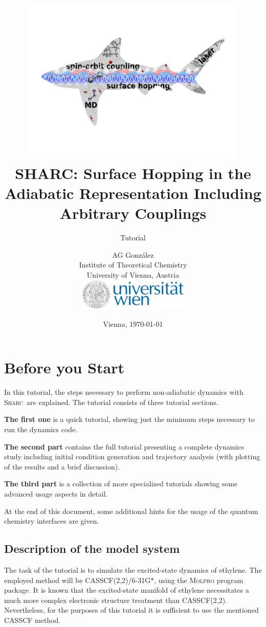 \documentclass[a4paper,11pt,DIV=15,openany]{scrbook}
\title{\hspace{1cm}\includegraphics[width=0.8\textwidth,keepaspectratio=true]{img/sharc.pdf}\vspace{1.5cm}\\
    SHARC: Surface Hopping in the Adiabatic Representation Including Arbitrary Couplings}
\subtitle{Tutorial}
\date{Vienna, \today}
\author{AG Gonz\'alez\\
Institute of Theoretical Chemistry\\
University of Vienna, Austria
\vspace{1cm}
\\
\includegraphics[width=0.4\textwidth,keepaspectratio=true]{img/univie.pdf}}
\newcommand{\sharc}{\textsc{Sharc}}
\begin{document}


\tableofcontents


\chapter{Before you Start}

In this tutorial, the steps necessary to perform non-adiabatic dynamics with \sharc\ are explained. 
The tutorial consists of three tutorial sections. 

\textbf{The first one} is a quick tutorial, showing just the minimum steps necessary to run the dynamics code. 

\textbf{The second part} contains the full tutorial presenting a complete dynamics study including initial condition generation and trajectory analysis (with plotting of the results and a brief discussion). 

\textbf{The third part} is a collection of more specialized tutorials showing some advanced usage aspects in detail.

At the end of this document, some additional hints for the usage of the quantum chemistry interfaces are given.




\section{Description of the model system}

The task of the tutorial is to simulate the excited-state dynamics of ethylene. The employed method will be CASSCF(2,2)/6-31G*, using the \textsc{Molpro} program package. It is known that the excited-state manifold of ethylene necessitates a much more complex electronic structure treatment than CASSCF(2,2). Nevertheless, for the purposes of this tutorial it is sufficient to use the mentioned CASSCF method.
\end{document}
